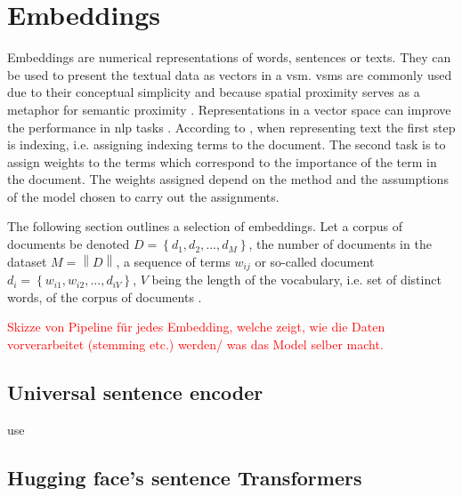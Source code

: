 \section{Embeddings}\label{sec:embeddings}

Embeddings are numerical representations of words, sentences or texts.
They can be used to present the textual data as vectors in a \ac{vsm}.
\acp{vsm} are commonly used due to their conceptual simplicity and because spatial proximity serves as a metaphor for semantic proximity \cite{tfidf2008}.
Representations in a vector space can improve the performance in \ac{nlp} tasks \cite{SkipGram2013}.
According to \citeauthor{tfidf2008}, when representing text the first step is indexing, i.e. assigning indexing terms to the document.
The second task is to assign weights to the terms which correspond to the importance of the term in the document.
The weights assigned depend on the method and the assumptions of the model chosen to carry out the assignments.

The following section outlines a selection of embeddings.
Let a corpus of documents be denoted $D= \left\{d_1, d_2, ..., d_M  \right\}$, the number of documents in the dataset $M = \left\| D \right\|$,
a sequence of terms $w_{ij}$ or so-called document $d_i = \left\{w_{i1}, w_{i2}, ..., d_{iV}  \right\}$, $V$ being the length of the vocabulary, 
i.e. set of distinct words, of the corpus of documents \cite{clusteringDocs2020}.

\cite{WordRep2013}
\cite{SentRep2014}

\textcolor{red}{Skizze von Pipeline für jedes Embedding, welche zeigt, wie die Daten vorverarbeitet (stemming etc.) werden/ was das Model selber macht.}










\subsection{Universal sentence encoder}\label{subsec:univ-sent-encoder}
\ac{use}
\cite{UniversalSentEnc2018}

\subsection{\infersent{}}\label{subsec:inferSent}
\infersent{}
\cite{inferSent2018}

\subsection{Hugging face's sentence Transformers}\label{subsec:hf-sent-ransformers}
\cite{HfsentTrans2019}